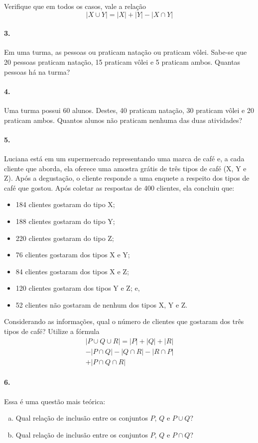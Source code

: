 \documentclass[a4paper,twocolumn,12pt]{article}
\begin{document}
Verifique que em todos os casos, vale a relação
\[|X\cup Y| = |X| + |Y| - |X\cap Y|\]


\paragraph{3.} Em uma turma, as pessoas ou praticam natação ou praticam vôlei. Sabe-se que 20 pessoas praticam natação, 15 praticam vôlei e 5 praticam ambos. Quantas pessoas há na turma?


\paragraph{4.} Uma turma possui 60 alunos. Destes, 40 praticam natação, 30 praticam vôlei e 20 praticam ambos. Quantos alunos não praticam nenhuma das duas atividades?

\paragraph{5.} Luciana está em um supermercado representando uma marca de café e, a cada cliente que aborda, ela oferece uma amostra grátis de três tipos de café (X, Y e Z). Após a degustação, o cliente responde a uma enquete a respeito dos tipos de café que gostou. Após coletar as respostas de 400 clientes, ela concluiu que:
\begin{itemize}
  \setlength{\itemsep}{1pt}
  \setlength{\itemindent}{1pt}
  \item 184 clientes gostaram do tipo X;
  \item 188 clientes gostaram do tipo Y;
  \item 220 clientes gostaram do tipo Z;
  \item 76 clientes gostaram dos tipos X e Y;
  \item 84 clientes gostaram dos tipos X e Z;
  \item 120 clientes gostaram dos tipos Y e Z; e,
  \item 52 clientes não gostaram de nenhum dos tipos X, Y e Z.
\end{itemize}
Considerando as informações, qual o número de clientes que gostaram dos três tipos de café? Utilize a fórmula 
\begin{multline*}
|P\cup Q\cup R| = |P| + |Q| + |R| \\ - |P\cap Q| - |Q\cap R| - |R\cap P| \\ + |P\cap Q \cap R|
\end{multline*} 


\paragraph{6.} Essa é uma questão mais teórica: 
\begin{enumerate}[a)] 
\item Qual relação de inclusão entre os conjuntos \(P\), \(Q\) e \(P\cup Q\)?
\item Qual relação de inclusão entre os conjuntos \(P\), \(Q\) e \(P\cap Q\)?
\end{enumerate}
\end{document}
